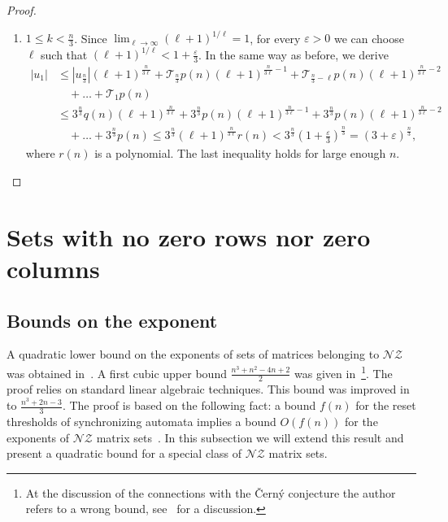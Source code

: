 \documentclass[a4paper,USenglish]{lipics}
\theoremstyle{definition}
\begin{document}
\begin{proof}
\begin{enumerate}
\item $1 \leq k < \frac{n}{3}$. 
Since $\lim_{\ell\to\infty} (\ell+1)^{1/\ell} = 1$, for every $\varepsilon>0$ we can choose $\ell$ such that $(\ell+1)^{1/\ell} < 1 + \frac{\varepsilon}{3}$. In the same way as before, we derive
\begin{align*}
|u_1| &\leq |u_\frac{n}{3}| (\ell + 1)^\frac{n}{3\ell} + \mathscr{T}_\frac{n}{3} p(n) (\ell+1)^{\frac{n}{3\ell}-1} + \mathscr{T}_{\frac{n}{3} - \ell} p(n) (\ell+1)^{\frac{n}{3\ell}-2}\\
&\quad+ \ldots + \mathscr{T}_1 p(n) \\ 
&\leq 3^\frac{n}{3} q(n) (\ell + 1)^\frac{n}{3\ell} + 3^\frac{n}{3} p(n) (\ell+1)^{\frac{n}{3\ell}-1} + 3^\frac{n}{3} p(n) (\ell+1)^{\frac{n}{3\ell} - 2}\\
&\quad+ \ldots + 3^\frac{n}{3} p(n) \leq 3^\frac{n}{3} (\ell+1)^{\frac{n}{3\ell}} r(n) < 3^{\frac{n}{3}}\left(1 + \frac{\varepsilon}{3}\right)^{\frac{n}{3}} = 
(3+\varepsilon)^{\frac{n}{3}},
\end{align*}
where $r(n)$ is a polynomial. The last inequality holds for large enough $n$.
\end{enumerate}
\end{proof}







\section{Sets with no zero rows nor zero columns}

\subsection{Bounds on the exponent}
A quadratic lower bound on the exponents of sets of matrices belonging to $\mathscr{NZ}$ was obtained in~\cite[Corollary 20]{BJO15}.
A first cubic upper bound $\tfrac{n^3+n^2-4n+2}{2}$ was given in~\cite[Theorem 1]{Voy13}\footnote{At the discussion of the connections with the \v{C}ern\'{y} conjecture the author refers to a wrong bound, see~\cite{GoJuTr15} for a discussion.}. The proof relies on standard linear algebraic techniques. This bound was improved in~\cite[Corollary 18]{BJO15} to $\tfrac{n^3+2n-3}{3}$. The proof is based on the following fact:
a bound $f(n)$ for the reset thresholds of synchronizing automata implies a bound $O(f(n))$ for the exponents of $\mathscr{NZ}$ matrix sets~\cite[Theorem 17]{BJO15}. In this subsection we will extend this result and present a quadratic bound for a special class of $\mathscr{NZ}$ matrix sets.
\end{document}
